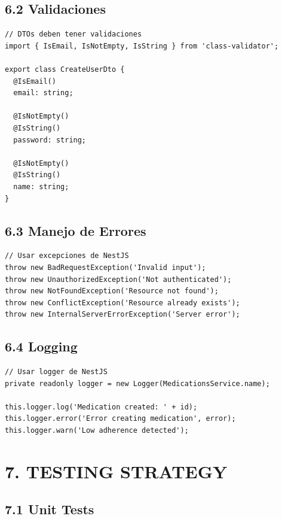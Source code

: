 \documentclass[12pt,a4paper]{article}
\begin{document}
\subsection{6.2 Validaciones}

\begin{verbatim}
// DTOs deben tener validaciones
import { IsEmail, IsNotEmpty, IsString } from 'class-validator';

export class CreateUserDto {
  @IsEmail()
  email: string;

  @IsNotEmpty()
  @IsString()
  password: string;

  @IsNotEmpty()
  @IsString()
  name: string;
}
\end{verbatim}

\subsection{6.3 Manejo de Errores}

\begin{verbatim}
// Usar excepciones de NestJS
throw new BadRequestException('Invalid input');
throw new UnauthorizedException('Not authenticated');
throw new NotFoundException('Resource not found');
throw new ConflictException('Resource already exists');
throw new InternalServerErrorException('Server error');
\end{verbatim}

\subsection{6.4 Logging}

\begin{verbatim}
// Usar logger de NestJS
private readonly logger = new Logger(MedicationsService.name);

this.logger.log('Medication created: ' + id);
this.logger.error('Error creating medication', error);
this.logger.warn('Low adherence detected');
\end{verbatim}

\section{7. TESTING STRATEGY}

\subsection{7.1 Unit Tests}
\end{document}
